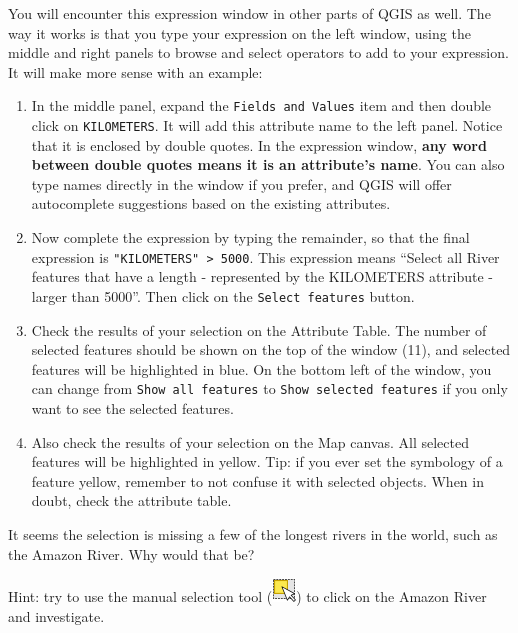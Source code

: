 \documentclass[
  letterpaper,
  DIV=11,
  numbers=noendperiod]{scrreprt}
\begin{document}
You will encounter this expression window in other parts of QGIS as
well. The way it works is that you type your expression on the left
window, using the middle and right panels to browse and select operators
to add to your expression. It will make more sense with an example:

\begin{enumerate}
\def\labelenumi{(\arabic{enumi})}
\setcounter{enumi}{78}
\item
  In the middle panel, expand the \texttt{Fields\ and\ Values} item and
  then double click on \texttt{KILOMETERS}. It will add this attribute
  name to the left panel. Notice that it is enclosed by double quotes.
  In the expression window, \textbf{any word between double quotes means
  it is an attribute's name}. You can also type names directly in the
  window if you prefer, and QGIS will offer autocomplete suggestions
  based on the existing attributes.
\item
  Now complete the expression by typing the remainder, so that the final
  expression is \texttt{"KILOMETERS"\ \textgreater{}\ 5000}. This
  expression means ``Select all River features that have a length -
  represented by the KILOMETERS attribute - larger than 5000''. Then
  click on the \texttt{Select\ features} button.
\item
  Check the results of your selection on the Attribute Table. The number
  of selected features should be shown on the top of the window (11),
  and selected features will be highlighted in blue. On the bottom left
  of the window, you can change from \texttt{Show\ all\ features} to
  \texttt{Show\ selected\ features} if you only want to see the selected
  features.
\item
  Also check the results of your selection on the Map canvas. All
  selected features will be highlighted in yellow. Tip: if you ever set
  the symbology of a feature yellow, remember to not confuse it with
  selected objects. When in doubt, check the attribute table.
\end{enumerate}

\begin{tcolorbox}[enhanced jigsaw, coltitle=black, toprule=.15mm, breakable, opacitybacktitle=0.6, left=2mm, colback=white, leftrule=.75mm, rightrule=.15mm, colbacktitle=quarto-callout-important-color!10!white, toptitle=1mm, titlerule=0mm, colframe=quarto-callout-important-color-frame, arc=.35mm, bottomtitle=1mm, opacityback=0, bottomrule=.15mm, title=\textcolor{quarto-callout-important-color}{\faExclamation}\hspace{0.5em}{Stop and Think}]

It seems the selection is missing a few of the longest rivers in the
world, such as the Amazon River. Why would that be?

Hint: try to use the manual selection tool
(\includegraphics{index_files/mediabag/mActionSelectRectang.png}) to
click on the Amazon River and investigate.

\end{tcolorbox}
\end{document}
